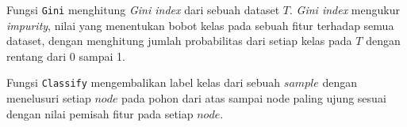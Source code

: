 Fungsi \texttt{Gini} menghitung \textit{Gini index} dari sebuah dataset $T$.
\textit{Gini index} mengukur \textit{impurity}, nilai yang menentukan bobot
kelas pada sebuah fitur terhadap semua dataset, dengan menghitung jumlah
probabilitas dari setiap kelas pada $T$ dengan rentang dari 0 sampai 1.

Fungsi \texttt{Classify} mengembalikan label kelas dari sebuah $sample$ dengan
menelusuri setiap $node$ pada pohon dari atas sampai node paling ujung sesuai
dengan nilai pemisah fitur pada setiap $node$.

